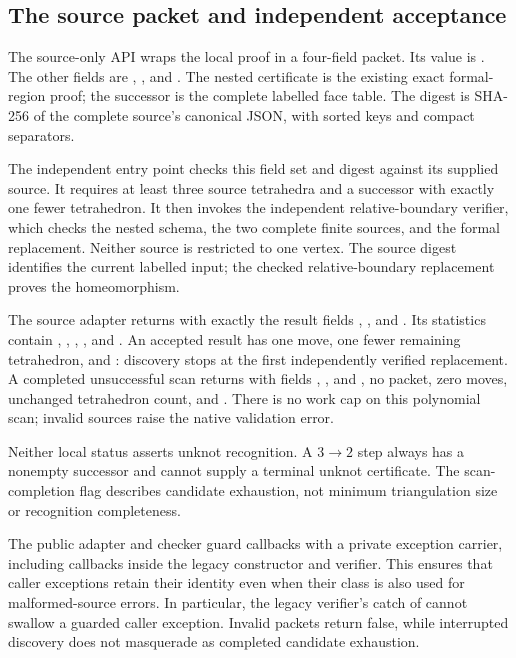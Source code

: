 \subsection{The source packet and independent acceptance}

The source-only API  wraps
the local proof in a four-field packet.  Its  value is
.  The other fields are ,
, and .  The nested certificate is the existing exact
 formal-region proof; the successor is the complete
labelled face table.  The digest is SHA-256 of the complete source's
canonical JSON, with sorted keys and compact separators.

The independent entry point  checks this
field set and digest against its supplied source.  It requires at least
three source tetrahedra and a successor with exactly one fewer tetrahedron.
It then invokes the independent relative-boundary verifier, which checks
the nested schema, the two complete finite sources, and the formal
replacement.  Neither source is restricted to one vertex.  The source
digest identifies the current labelled input; the checked relative-boundary
replacement proves the homeomorphism.

The source adapter returns  with exactly the result fields
, , and .  Its statistics
contain , ,
, , and .
An accepted result has one move, one fewer remaining tetrahedron, and
: discovery stops at the first independently
verified replacement.  A completed unsuccessful scan returns
 with fields , , and
, no packet, zero moves, unchanged tetrahedron count, and
.  There is no work cap on this polynomial
scan; invalid sources raise the native validation error.

Neither local status asserts unknot recognition.  A $3\to2$ step always
has a nonempty successor and cannot supply a terminal unknot certificate.
The scan-completion flag describes candidate exhaustion, not minimum
triangulation size or recognition completeness.

The public adapter and checker guard callbacks with a private exception
carrier, including callbacks inside the legacy constructor and verifier.
This ensures that caller exceptions retain their identity even when their
class is also used for malformed-source errors.  In particular, the
legacy verifier's catch of  cannot swallow a
guarded caller exception.  Invalid packets return false, while interrupted
discovery does not masquerade as completed candidate exhaustion.

